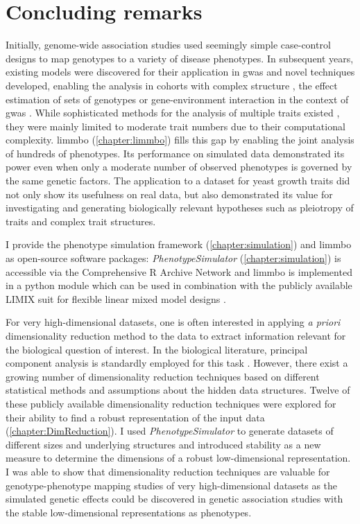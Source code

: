 \chapter{Concluding remarks}
Initially, genome-wide association studies used seemingly simple case-control designs to map genotypes to a variety of disease phenotypes. In subsequent years, existing models were discovered for their application in \gls{gwas} \citep{Korte2012} and novel techniques developed, enabling the analysis in cohorts with complex structure \citep{Yu2006,Kang2010}, the effect estimation of sets of genotypes \citep{Wu2010,Casale2015} or gene-environment interaction in the context of \gls{gwas} \citep{Casale2017}. While sophisticated methods for the analysis of multiple traits existed \citep{Korte2012,Zhou2012,Casale2015}, they were mainly limited to moderate trait numbers due to their computational complexity. \gls{limmbo} (\cref{chapter:limmbo}) fills this gap by enabling the joint analysis of hundreds of phenotypes.  Its performance on simulated data demonstrated its power even when only a moderate number of observed phenotypes is governed by the same genetic factors. The application to a dataset for yeast growth traits did not only show its usefulness on real data, but also demonstrated its value for investigating and generating biologically relevant hypotheses such as pleiotropy of traits and complex trait structures. 

I provide the phenotype simulation framework (\cref{chapter:simulation}) and \gls{limmbo} as open-source software packages: \textit{PhenotypeSimulator} (\cref{chapter:simulation}) is accessible via the Comprehensive R Archive Network \citep{Meyer2017b} and \gls{limmbo} is implemented in a python module which can be used in combination with the publicly available LIMIX suit for flexible linear mixed model designs \citep{Lippert2014}.

For very high-dimensional datasets, one is often interested in applying \textit{a priori} dimensionality reduction method to the data to extract information relevant for the biological question of interest. In the biological literature, principal component analysis is standardly employed for this task \citep{Avery2011,Liu2012,Zhang2012}. However, there exist a growing number of dimensionality reduction techniques based on different statistical methods and assumptions about the hidden data structures. Twelve of these publicly available dimensionality reduction techniques were explored for their ability to find a robust representation of the input data (\cref{chapter:DimReduction}). I used \textit{PhenotypeSimulator} to generate datasets of different sizes and underlying structures and introduced stability as a new measure to determine the dimensions of a robust low-dimensional representation. I was able to show that dimensionality reduction techniques are valuable for genotype-phenotype mapping studies of very high-dimensional datasets as the simulated genetic effects could be discovered in genetic association studies with the stable low-dimensional representations as phenotypes.

